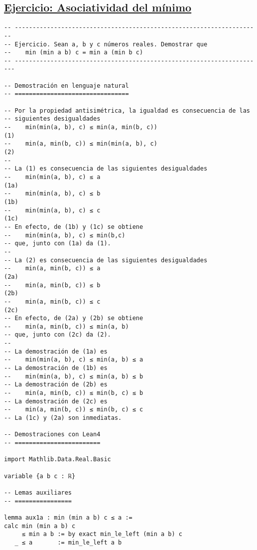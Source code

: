 \subsection{\href{./src/Basicos/Asociatividad\_del\_minimo.lean}{Ejercicio: Asociatividad del mínimo}}
\label{sec:org29de909}
\begin{verbatim}
-- ---------------------------------------------------------------------
-- Ejercicio. Sean a, b y c números reales. Demostrar que
--    min (min a b) c = min a (min b c)
-- ----------------------------------------------------------------------

-- Demostración en lenguaje natural
-- ================================

-- Por la propiedad antisimétrica, la igualdad es consecuencia de las
-- siguientes desigualdades
--    min(min(a, b), c) ≤ min(a, min(b, c))                           (1)
--    min(a, min(b, c)) ≤ min(min(a, b), c)                           (2)
--
-- La (1) es consecuencia de las siguientes desigualdades
--    min(min(a, b), c) ≤ a                                          (1a)
--    min(min(a, b), c) ≤ b                                          (1b)
--    min(min(a, b), c) ≤ c                                          (1c)
-- En efecto, de (1b) y (1c) se obtiene
--    min(min(a, b), c) ≤ min(b,c)
-- que, junto con (1a) da (1).
--
-- La (2) es consecuencia de las siguientes desigualdades
--    min(a, min(b, c)) ≤ a                                          (2a)
--    min(a, min(b, c)) ≤ b                                          (2b)
--    min(a, min(b, c)) ≤ c                                          (2c)
-- En efecto, de (2a) y (2b) se obtiene
--    min(a, min(b, c)) ≤ min(a, b)
-- que, junto con (2c) da (2).
--
-- La demostración de (1a) es
--    min(min(a, b), c) ≤ min(a, b) ≤ a
-- La demostración de (1b) es
--    min(min(a, b), c) ≤ min(a, b) ≤ b
-- La demostración de (2b) es
--    min(a, min(b, c)) ≤ min(b, c) ≤ b
-- La demostración de (2c) es
--    min(a, min(b, c)) ≤ min(b, c) ≤ c
-- La (1c) y (2a) son inmediatas.

-- Demostraciones con Lean4
-- ========================

import Mathlib.Data.Real.Basic

variable {a b c : ℝ}

-- Lemas auxiliares
-- ================

lemma aux1a : min (min a b) c ≤ a :=
calc min (min a b) c
     ≤ min a b := by exact min_le_left (min a b) c
   _ ≤ a       := min_le_left a b


\end{verbatim}
